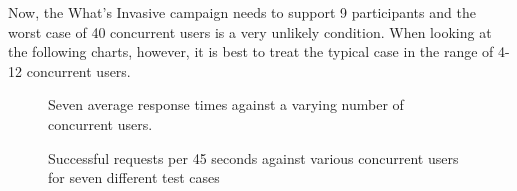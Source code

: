 \documentclass[10pt,a4paper,english]{article}
\begin{document}
Now, the What's Invasive campaign needs to support 9 participants and the worst case of 40 concurrent users is a very unlikely condition. When looking at the following charts, however, it is best to treat the typical case in the range of 4-12 concurrent users.
\begin{figure}[htbp]
\centering

\caption{Seven average response times against a varying number of concurrent users.}\end{figure}
\begin{figure}[htbp]
\centering

\caption{Successful requests per 45 seconds against various concurrent users for seven different test cases}\end{figure}
\end{document}
